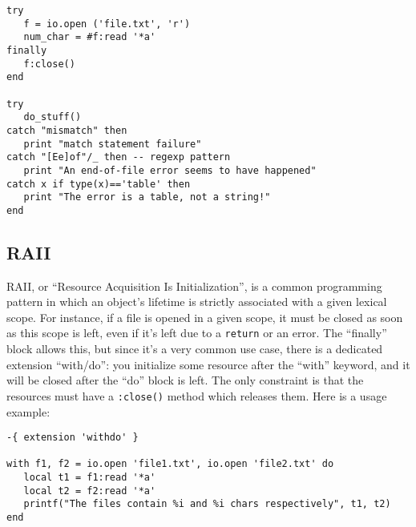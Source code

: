 \begin{verbatim}
try
   f = io.open ('file.txt', 'r')
   num_char = #f:read '*a'
finally
   f:close()
end

try
   do_stuff()
catch "mismatch" then
   print "match statement failure"
catch "[Ee]of"/_ then -- regexp pattern
   print "An end-of-file error seems to have happened"
catch x if type(x)=='table' then
   print "The error is a table, not a string!"
end
\end{verbatim}

 \subsection{RAII}
 RAII, or ``Resource Acquisition Is Initialization'', is a common
 programming pattern in which an object's lifetime is strictly
 associated with a given lexical scope. For instance, if a file is
 opened in a given scope, it must be closed as soon as this scope is
 left, even if it's left due to a {\tt return} or an error. The
 ``finally'' block allows this, but since it's a very common use case,
 there is a dedicated extension ``with/do'': you initialize some resource
 after the ``with'' keyword, and it will be closed after the ``do''
 block is left. The only constraint is that the resources must have a
 {\tt:close()} method which releases them. Here is a usage example:

\begin{verbatim}
-{ extension 'withdo' }

with f1, f2 = io.open 'file1.txt', io.open 'file2.txt' do
   local t1 = f1:read '*a'
   local t2 = f2:read '*a'
   printf("The files contain %i and %i chars respectively", t1, t2)
end
\end{verbatim}

